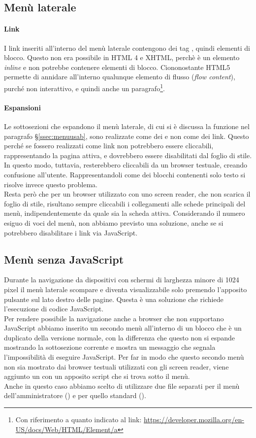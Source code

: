 \documentclass[12pt]{article}
\begin{document}
	\subsection{Menù laterale}
	\paragraph{Link}
	I link inseriti all'interno del menù laterale contengono dei tag , quindi elementi di blocco. Questo non era possibile in HTML 4 e XHTML, perchè  è un elemento \textit{inline} e non potrebbe contenere elementi di blocco. Ciononostante HTML5 permette di annidare all'interno qualunque elemento di flusso (\textit{flow content}), purché non interattivo, e quindi anche un paragrafo\footnote{Con riferimento a quanto indicato al link: \url{https://developer.mozilla.org/en-US/docs/Web/HTML/Element/a}}.
	\paragraph{Espansioni}
	Le sottosezioni che espandono il menù laterale, di cui si è discussa la funzione nel paragrafo §\ref{ssec:menuusab}, sono realizzate come dei  e non come dei link. Questo perché se fossero realizzati come link non potrebbero essere cliccabili, rappresentando la pagina attiva, e dovrebbero essere disabilitati dal foglio di stile. In questo modo, tuttavia, resterebbero cliccabili da un browser testuale, creando confusione all'utente. Rappresentandoli come dei blocchi contenenti solo testo si risolve invece questo problema.\\
	Resta però che per un browser utilizzato con uno screen reader, che non scarica il foglio di stile, risultano sempre cliccabili i collegamenti alle schede principali del menù, indipendentemente da quale sia la scheda attiva. Considerando il numero esiguo di voci del menù, non abbiamo previsto una soluzione, anche se si potrebbero disabilitare i link via JavaScript.
	
	\subsection{Menù senza JavaScript}
	Durante la navigazione da dispositivi con schermi di larghezza minore di 1024 pixel il menù laterale scompare e diventa visualizzabile solo premendo l'apposito pulsante sul lato destro delle pagine. Questa è una soluzione che richiede l'esecuzione di codice JavaScript.\\Per rendere possibile la navigazione anche a browser che non supportano JavaScript abbiamo inserito un secondo menù all'interno di un blocco  che è un duplicato della versione normale, con la differenza che questo non si espande mostrando la sottosezione corrente e mostra un messaggio che segnala l'impossibilità di eseguire JavaScript. Per far in modo che questo secondo menù non sia mostrato dai browser testuali utilizzati con gli screen reader, viene aggiunto un  con un apposito script che si trova sotto il menù.\\
	Anche in questo caso abbiamo scelto di utilizzare due file separati per il menù dell'amministratore () e per quello standard (). 
	
\end{document}
